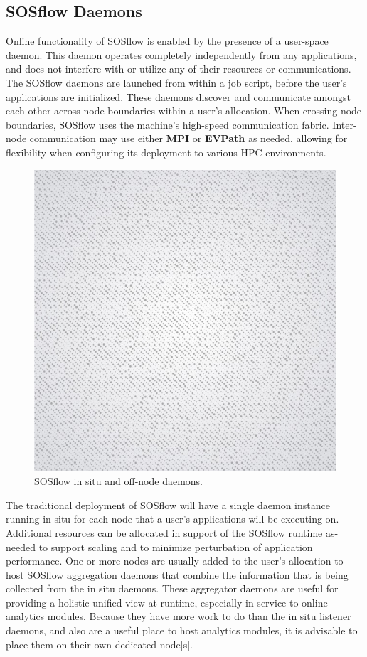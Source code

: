\subsection{SOSflow Daemons}
%
Online functionality of SOSflow is enabled by the presence of a
user-space daemon.
%
This daemon operates completely independently from any applications, and
does not interfere with or utilize any of their resources or
communications.
%
The SOSflow daemons are launched from within a job script, before the user's
applications are initialized.
%
These daemons discover and communicate amongst each other across 
node boundaries within a user's allocation.
%
When crossing node boundaries, SOSflow uses the machine's high-speed
communication fabric.
%
Inter-node communication may use either \textbf{MPI} or \textbf{EVPath} as
needed, allowing for flexibility when configuring its deployment to
various HPC environments.
%
\begin{figure}[h]
\centering
\includegraphics[width=\columnwidth]{images/placeholder.jpg}
\caption{SOSflow in situ and off-node daemons.}
\label{fig_daemons}
\end{figure}
%
%
\par
%
The traditional deployment of SOSflow will have a single daemon instance
running in situ for each node that a user's applications will be
executing on.
%
Additional resources can be allocated in support of the SOSflow runtime
as-needed to support scaling and to minimize perturbation of application
performance.
%
One or more nodes are usually added to the user's allocation to
host SOSflow aggregation daemons that combine the information
that is being collected from the in situ daemons.
%
These aggregator daemons are useful for providing a holistic unified view
at runtime, especially in service to online analytics modules.
%
Because they have more work to do than the in situ listener daemons, and
also are a useful place to host analytics modules, it is advisable to
place them on their own dedicated node[s].
%
%
